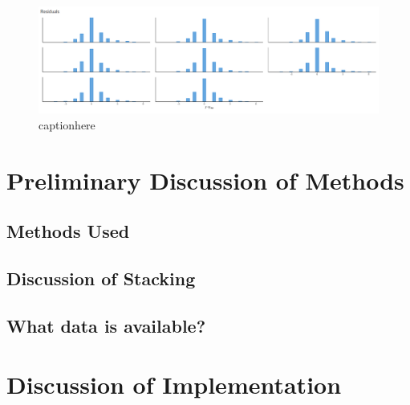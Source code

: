 \documentclass[10pt,a4paper, hidelinks]{article} %
\begin{document}
\begin{figure}
	\centering
	\includegraphics[width=1\linewidth]{../fig/polr_residuals}
	\caption{captionhere}
	\label{fig:residuals}
\end{figure}


\section{Preliminary Discussion of Methods}

\subsection{Methods Used}
\lipsum
\subsection{Discussion of Stacking}
\lipsum
\subsection{What data is available?}
\lipsum
\section{Discussion of Implementation}
\lipsum
\end{document}

